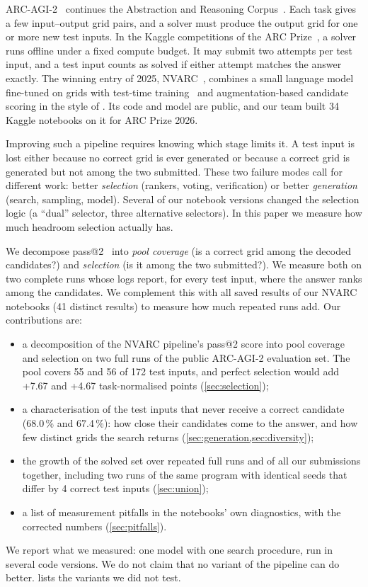\documentclass[11pt]{article}
\begin{document}
ARC-AGI-2~\citep{chollet2025arcagi2} continues the Abstraction and Reasoning Corpus~\citep{chollet2019measure}. Each task gives a few input--output grid pairs, and a solver must produce the output grid for one or more new test inputs.
In the Kaggle competitions of the ARC Prize~\citep{chollet2024arcprize,arcprize2026kaggle}, a solver runs offline under a fixed compute budget. It may submit two attempts per test input, and a test input counts as solved if either attempt matches the answer exactly.
The winning entry of 2025, NVARC~\citep{nvarc2025}, combines a small language model fine-tuned on grids with test-time training~\citep{akyurek2024ttt} and augmentation-based candidate scoring in the style of \citet{franzen2025poe}.
Its code and model are public, and our team built 34 Kaggle notebooks on it for ARC Prize 2026.

Improving such a pipeline requires knowing which stage limits it. A test input is lost either because no correct grid is ever generated or because a correct grid is generated but not among the two submitted. These two failure modes call for different work: better \emph{selection} (rankers, voting, verification) or better \emph{generation} (search, sampling, model).
Several of our notebook versions changed the selection logic (a ``dual'' selector, three alternative selectors). In this paper we measure how much headroom selection actually has.

We decompose pass@2~\citep{chen2021codex} into \emph{pool coverage} (is a correct grid among the decoded candidates?) and \emph{selection} (is it among the two submitted?). We measure both on two complete runs whose logs report, for every test input, where the answer ranks among the candidates.
We complement this with all saved results of our NVARC notebooks (41 distinct results) to measure how much repeated runs add.
Our contributions are:
\begin{itemize}
\item a decomposition of the NVARC pipeline's pass@2 score into pool coverage and selection on two full runs of the public ARC-AGI-2 evaluation set. The pool covers 55 and 56 of 172 test inputs, and perfect selection would add +7.67 and +4.67 task-normalised points (\cref{sec:selection});
\item a characterisation of the test inputs that never receive a correct candidate (68.0\,\% and 67.4\,\%): how close their candidates come to the answer, and how few distinct grids the search returns (\cref{sec:generation,sec:diversity});
\item the growth of the solved set over repeated full runs and of all our submissions together, including two runs of the same program with identical seeds that differ by 4 correct test inputs (\cref{sec:union});
\item a list of measurement pitfalls in the notebooks' own diagnostics, with the corrected numbers (\cref{sec:pitfalls}).
\end{itemize}
We report what we measured: one model with one search procedure, run in several code versions. We do not claim that no variant of the pipeline can do better.  lists the variants we did not test.
\end{document}
